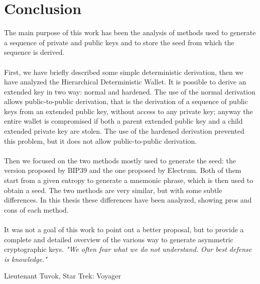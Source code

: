 
\chapter*{Conclusion} %
\label{Conclusion} %


The main purpose of this work has been the analysis of methods used to generate a sequence of private and public keys and to store the seed from which the sequence is derived. 
\\ \\
First, we have briefly described some simple deterministic derivation, then we have analyzed the Hierarchical Deterministic Wallet. It is possible to derive an extended key in two way: normal and hardened. The use of the normal derivation allows public-to-public derivation, that is the derivation of a sequence of public keys from an extended public key, without access to any private key; anyway the entire wallet is compromised if both a parent extended public key and a child extended private key are stolen. The use of the hardened derivation prevented this problem, but it does not allow public-to-public derivation. 
\\ \\
Then we focused on the two methods mostly used to generate the seed: the version proposed by BIP39 and the one proposed by Electrum. Both of them start from a given entropy to generate a mnemonic phrase, which is then used to obtain a seed. The two methods are very similar, but with some subtle differences. In this thesis these differences have been analyzed, showing pros and cons of each method. 
\\ \\
It was not a goal of this work to point out a better proposal, but to provide a complete and detailed overview of the various way to generate asymmetric cryptographic keys.
\vfill
\textit{"We often fear what we do not understand. Our best defense is knowledge."}
\begin{flushright}
	Lieutenant Tuvok, Star Trek: Voyager
\end{flushright}

